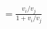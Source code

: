 \documentclass[preview]{standalone}
\begin{document}
\begin{align*}
= \frac{v_i / v_j}{1 + v_i / v_j}
\end{align*}
\end{document}

